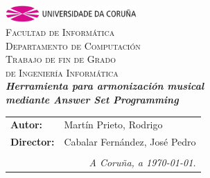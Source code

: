 \begin{titlepage}
\begin{center}
\includegraphics[width=5cm]{imagenes/anagramaUDC.png}\\[0.5cm]
{\textsc{Facultad de Informática}} \\
{\large \textsc{Departamento de Computación}} \\[1cm]
{\Large \textsc{Trabajo de fin de Grado}} \\
{\Large \textsc{de Ingeniería Informática}} \\[2cm]
{\Large \textsl{\textbf{Herramienta para armonización musical}}} \\[0.15cm]
{\Large \textsl{\textbf{mediante Answer Set Programming}}} \\
\vfill
\begin{flushright}
\begin{tabular}{ll}
\textbf{Autor:}    & Martín Prieto, Rodrigo \\
\textbf{Director:} & Cabalar Fernández, José Pedro \\
& \\
\multicolumn{2}{r}{\small \emph{A Coruña, a \today{}.}} \\
\end{tabular}
\end{flushright}
\end{center}
\end{titlepage}
